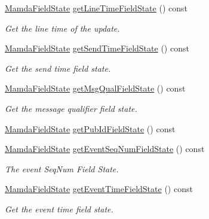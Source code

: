 \begin{CompactItemize}
\hyperlink{namespaceWombat_93aac974f2ab713554fd12a1fa3b7d2a}{Mamda\-Field\-State} \hyperlink{classWombat_1_1MamdaTradeListener_dca5ca34bb9de2bdd8579a618dda72dd}{get\-Line\-Time\-Field\-State} () const 
\begin{CompactList}\small\item\em Get the line time of the update. \item\end{CompactList}\item 
\hyperlink{namespaceWombat_93aac974f2ab713554fd12a1fa3b7d2a}{Mamda\-Field\-State} \hyperlink{classWombat_1_1MamdaTradeListener_1a7d2527a9aa376990eb4f50a799996a}{get\-Send\-Time\-Field\-State} () const 
\begin{CompactList}\small\item\em Get the send time field state. \item\end{CompactList}\item 
\hyperlink{namespaceWombat_93aac974f2ab713554fd12a1fa3b7d2a}{Mamda\-Field\-State} \hyperlink{classWombat_1_1MamdaTradeListener_415c8f22e03ada875aeb985455d8fc92}{get\-Msg\-Qual\-Field\-State} () const 
\begin{CompactList}\small\item\em Get the message qualifier field state. \item\end{CompactList}\item 
\hyperlink{namespaceWombat_93aac974f2ab713554fd12a1fa3b7d2a}{Mamda\-Field\-State} \hyperlink{classWombat_1_1MamdaTradeListener_e3cb9fc3b97c1e3e33392db6221e45ec}{get\-Pub\-Id\-Field\-State} () const 
\item 
\hyperlink{namespaceWombat_93aac974f2ab713554fd12a1fa3b7d2a}{Mamda\-Field\-State} \hyperlink{classWombat_1_1MamdaTradeListener_22fb35889eb20ecd6e52d01d5227a74c}{get\-Event\-Seq\-Num\-Field\-State} () const 
\begin{CompactList}\small\item\em The event Seq\-Num Field State. \item\end{CompactList}\item 
\hyperlink{namespaceWombat_93aac974f2ab713554fd12a1fa3b7d2a}{Mamda\-Field\-State} \hyperlink{classWombat_1_1MamdaTradeListener_db4c54a4b13c5cff7a25f15d524fbcd8}{get\-Event\-Time\-Field\-State} () const 
\begin{CompactList}\small\item\em Get the event time field state. \item\end{CompactList}\item 

\end{CompactItemize}
